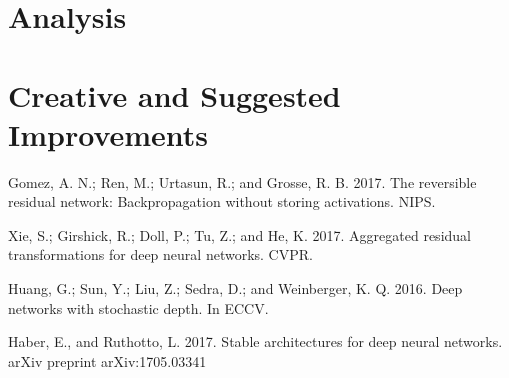 \documentclass{article}
\theoremstyle{remark}
\begin{document}
\section*{Analysis}
\section*{Creative and Suggested Improvements}
    

\begin{thebibliography}{9}

        Gomez, A. N.; Ren, M.; Urtasun, R.; and Grosse, R. B. 2017.
        The reversible residual network: Backpropagation without storing
        activations. NIPS.

        Xie, S.; Girshick, R.; Doll, P.; Tu, Z.; and He, K. 2017. 
        Aggregated residual transformations for deep neural networks. CVPR.

        Huang, G.; Sun, Y.; Liu, Z.; Sedra, D.; and Weinberger, K. Q. 2016.
        Deep networks with stochastic depth. In ECCV.

        Haber, E., and Ruthotto, L. 2017. Stable architectures for deep
        neural networks. arXiv preprint arXiv:1705.03341

\end{thebibliography}
\end{document}
